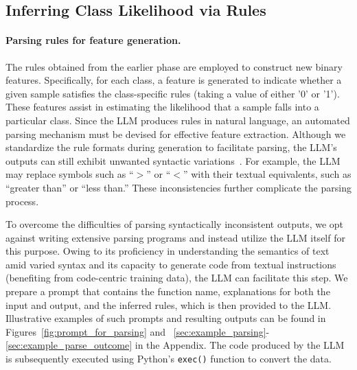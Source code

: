 \subsection{Inferring Class Likelihood via Rules}
\label{Sec:training}

\paragraph{Parsing rules for feature generation.} The rules obtained from the earlier phase are employed to construct new binary features. Specifically, for each class, a feature is generated to indicate whether a given sample satisfies the class-specific rules (taking a value of either '0' or '1'). These features assist in estimating the likelihood that a sample falls into a particular class. Since the LLM produces rules in natural language, an automated parsing mechanism must be devised for effective feature extraction. Although we standardize the rule formats during generation to facilitate parsing, the LLM's outputs can still exhibit unwanted syntactic variations~\cite{kovavc2023large}. For example, the LLM may replace symbols such as ``$>$” or ``$<$” with their textual equivalents, such as ``greater than'' or ``less than.'' These inconsistencies further complicate the parsing process.

To overcome the difficulties of parsing syntactically inconsistent outputs, we opt against writing extensive parsing programs and instead utilize the LLM itself for this purpose. Owing to its proficiency in understanding the semantics of text amid varied syntax and its capacity to generate code from textual instructions (benefiting from code-centric training data), the LLM can facilitate this step. We prepare a prompt that contains the function name, explanations for both the input and output, and the inferred rules, which is then provided to the LLM. Illustrative examples of such prompts and resulting outputs can be found in Figures~\ref{fig:prompt_for_parsing} and ~\ref{sec:example_parsing}-\ref{sec:example_parse_outcome} in the Appendix. The code produced by the LLM is subsequently executed using Python’s \texttt{exec()} function to convert the data.

\vspace*{-0.12in}

